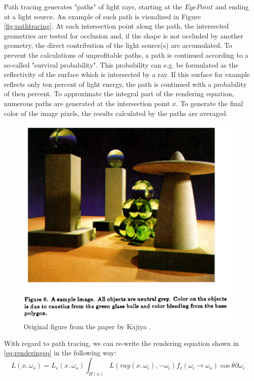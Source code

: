 Path tracing generates "paths" of light rays, starting at the $Eye Point$ and ending at a light source. An example of such path is visualized in Figure \ref{fig:pathtracing}. At each intersection point along the path, the intersected geometries are tested for occlusion and, if the shape is not occluded by another geometry, the direct contribution of the light source(s) are accumulated. 
To prevent the calculations of unprofitable paths, a path is continued according to a so-called "survival probability". This probability can e.g. be formulated as the reflectivity of the surface which is intersected by a ray. If this surface for example reflects only ten percent of light energy, the path is continued with a probability of then percent.
To approximate the integral part of the rendering equation, numerous paths are generated at the intersection point $x$. To generate the final color of the image pixels, the results calculated by the paths are averaged.

\begin{figure}
	\centering
	\includegraphics[width=.7\linewidth]{img/1 fundamentals/rendering_eq_figure.png}
	\caption{Original figure from the paper  by Kajiya \cite{kajiya1986rendering}.}
	\label{fig:kajiya_figure}
\end{figure}

With regard to path tracing, we can re-write the rendering equation shown in \ref{eq:renderingeq} in the following way:
\begin{equation}\label{eq:renderingeq_update}
L(x, \omega_{o}) = L_{e}(x, \omega_{o}) \int_{H(x)} L(ray(x, \omega_{i}), -\omega_{i})f_{r}(\omega_{i} \rightarrow \omega_{o})\cos\theta\partial\omega_{i}
\end{equation}

